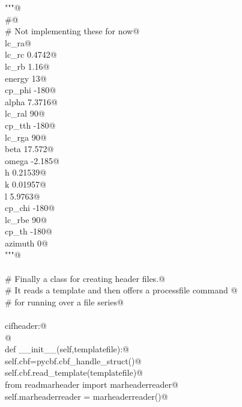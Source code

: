 \documentclass[10pt,a4paper,twoside,notitlepage]{article}
\begin{document}
\begin{flushleft}
\begin{minipage}{\linewidth}
\begin{list}{}{}
\mbox{}\verb@"""@\\
\mbox{}\verb@    #@\\
\mbox{}\verb@    # Not implementing these for now@\\
\mbox{}\verb@    lc_ra@\\
\mbox{}\verb@    lc_rc 0.4742@\\
\mbox{}\verb@    lc_rb 1.16@\\
\mbox{}\verb@    energy 13@\\
\mbox{}\verb@    cp_phi -180@\\
\mbox{}\verb@    alpha 7.3716@\\
\mbox{}\verb@    lc_ral 90@\\
\mbox{}\verb@    cp_tth -180@\\
\mbox{}\verb@    lc_rga 90@\\
\mbox{}\verb@    beta 17.572@\\
\mbox{}\verb@    omega -2.185@\\
\mbox{}\verb@    h 0.21539@\\
\mbox{}\verb@    k 0.01957@\\
\mbox{}\verb@    l 5.9763@\\
\mbox{}\verb@    cp_chi -180@\\
\mbox{}\verb@    lc_rbe 90@\\
\mbox{}\verb@    cp_th -180@\\
\mbox{}\verb@    azimuth 0@\\
\mbox{}\verb@"""@\\
\mbox{}\verb@@\\
\mbox{}\verb@# Finally a class for creating header files.@\\
\mbox{}\verb@# It reads a template and then offers a processfile command @\\
\mbox{}\verb@# for running over a file series@\\
\mbox{}\verb@@\\
\mbox{}\verb@class cifheader:@\\
\mbox{}\verb@    @\\
\mbox{}\verb@    def __init__(self,templatefile):@\\
\mbox{}\verb@        self.cbf=pycbf.cbf_handle_struct()@\\
\mbox{}\verb@        self.cbf.read_template(templatefile)@\\
\mbox{}\verb@        from readmarheader import marheaderreader@\\
\mbox{}\verb@        self.marheaderreader = marheaderreader()@\\

\end{list}
\end{minipage}
\end{flushleft}
\end{document}

